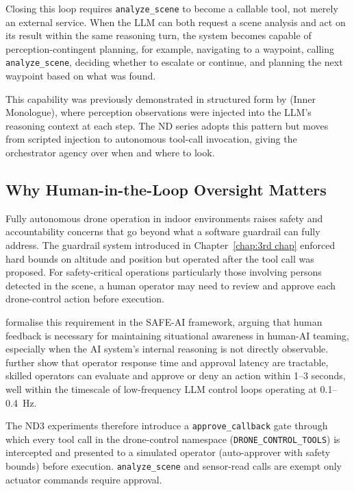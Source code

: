 Closing this loop requires \texttt{analyze\_scene} to become a callable tool, not merely an external service.
When the LLM can both request a scene analysis and act on its result within the same reasoning turn, the system becomes capable of perception-contingent
planning, for example, navigating to a waypoint, calling \texttt{analyze\_scene}, deciding whether to escalate or continue, and planning the next waypoint based on what was found.

This capability was previously demonstrated in structured form by \citet{huang2022innermonologue}
(Inner Monologue), where perception observations were injected into the LLM's reasoning context at each step.  
The ND series adopts this pattern but moves from scripted injection to autonomous tool-call invocation, giving the orchestrator agency over when and where to look.

\subsection{Why Human-in-the-Loop Oversight Matters}
\label{sec:ch4_problem_hitl}

Fully autonomous drone operation in indoor environments raises safety and accountability
concerns that go beyond what a software guardrail can fully address.  
The guardrail system introduced in Chapter~\ref{chap:3rd chap} enforced hard bounds on altitude and position but operated after the tool call was proposed.  
For safety-critical operations particularly those involving persons detected in the scene, a human operator may need to review and approve each drone-control action before execution.

\citet{sanneman2022safeai} formalise this requirement in the SAFE-AI framework, arguing that human feedback is necessary for maintaining situational awareness in human-AI teaming, especially when the AI system's internal reasoning is not directly observable.
\citet{chen2018humanperformance} further show that operator response time and approval latency are tractable, skilled operators can evaluate and approve or deny an action within 1--3 seconds, well within the timescale of low-frequency LLM control loops operating at 0.1--0.4~Hz.

The ND3 experiments therefore introduce a \texttt{approve\_callback} gate through which every tool call in the drone-control namespace (\texttt{DRONE\_CONTROL\_TOOLS}) is intercepted and presented to a simulated operator (auto-approver with safety bounds) before execution.
\texttt{analyze\_scene} and sensor-read calls are exempt only actuator commands require approval.

